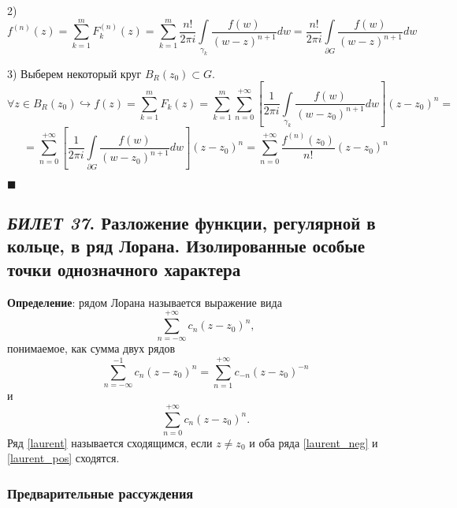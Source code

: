 \documentclass[12pt, a4paper, reqno]{article}
\begin{document}
    2)
    \begin{equation*}
        f^{(n)}(z) = \sum\limits_{k = 1}^{m} F_k^{(n)}(z) =
        \sum\limits_{k = 1}^{m} \frac{n!}{2\pi i}\int\limits_{\gamma_k}\frac{f(w)}{(w - z)^{n + 1}}dw =
        \frac{n!}{2\pi i}\int\limits_{\partial G}\frac{f(w)}{(w - z)^{n + 1}}dw
    \end{equation*}

    3) Выберем некоторый круг $B_R(z_0) \subset G$.
    \begin{equation*}
        \forall z \in B_R(z_0) \hookrightarrow f(z) = \sum\limits_{k = 1}^{m} F_k(z) =
        \sum\limits_{k = 1}^{m} \sum\limits_{n = 0}^{+\infty}\left[\frac{1}{2\pi i}
                                \int\limits_{\gamma_k}\frac{f(w)}{(w - z_0)^{n + 1}}dw\right](z - z_0)^n =
    \end{equation*}
    \begin{equation*}
        = \sum\limits_{n = 0}^{+\infty}\left[\frac{1}{2\pi i}
            \int\limits_{\partial G}\frac{f(w)}{(w - z_0)^{n + 1}}dw\right](z - z_0)^n =
        \sum\limits_{n = 0}^{+\infty} \frac{f^{(n)}(z_0)}{n!}(z - z_0)^n
    \end{equation*}

    $\blacksquare$

\newpage
\subsection{\textit{БИЛЕТ 37}. Разложение функции, регулярной в кольце, в ряд Лорана. Изолированные
            особые точки однозначного характера}

    \textbf{Определение}: рядом Лорана называется выражение вида
    \begin{equation}\label{laurent}
        \sum\limits_{n = -\infty}^{+\infty} c_n (z - z_0)^n,
    \end{equation}
    понимаемое, как сумма двух рядов
    \begin{equation}\label{laurent_neg}
        \sum\limits_{n = -\infty}^{-1} c_n (z - z_0)^n =
        \sum\limits_{n = 1}^{+\infty} c_{-n} (z - z_0)^{-n}
    \end{equation}
    и
    \begin{equation}\label{laurent_pos}
        \sum\limits_{n = 0}^{+\infty} c_n (z - z_0)^n.
    \end{equation}
    Ряд \eqref{laurent} называется сходящимся, если $z \neq z_0$ и оба ряда \eqref{laurent_neg} и
    \eqref{laurent_pos} сходятся.

    \subsubsection{Предварительные рассуждения}
\end{document}
